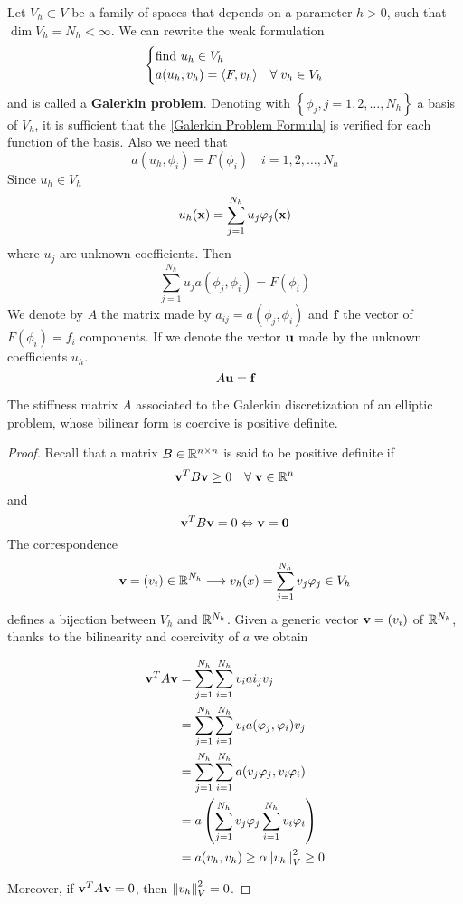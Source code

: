 Let \(V_h \subset V\) be a family of spaces that depends on a parameter \(h > 0\), such that \(\dim V_h = N_h < \infty\).
We can rewrite the weak formulation 
\begin{equation}
    \begin{cases}
        \text{find } u_h \in V_h\\
        a(u_h,v_h) = \langle F,v_h \rangle & \forall \; v_h \in V_h \label{Galerkin Problem Formula}
    \end{cases}
\end{equation}
and is called a \textbf{Galerkin problem}. Denoting with \(\left\{\phi_j, j = 1,2,\ldots,N_h\right\}\) a basis of \(V_h\), it is sufficient that the \eqref{Galerkin Problem Formula} is verified for each function of the basis. 
Also we need that 
\[
    a(u_h, \phi_i) = F(\phi_i) \quad i = 1, 2, \ldots , N_h
\]
Since \(u_h \in V_h\)
\[
    u_h(\textbf{x})=\sum_{j=1}^{N_h} u_j \varphi_j(\textbf{x})
\]
where \(u_j\) are unknown coefficients. Then
\[
    \sum_{j=1}^{N_h}u_j a(\phi_j, \phi_i) = F(\phi_i)
\]
We denote by \(A\) the matrix made by \(a_{ij} = a(\phi_j, \phi_i)\) and \(\textbf{f}\) the vector of \(F(\phi_i) = f_i\) components. If we denote the vector \(\textbf{u}\) made by the unknown coefficients \(u_h\).
\begin{equation}
    A\textbf{u} = \textbf{f}
    \label{Linear system Galerkin}
\end{equation}

    \begin{theorem}
    The stiffness matrix \(A\) associated to the Galerkin discretization of an elliptic problem, whose bilinear form is coercive is positive definite.
\end{theorem}
\begin{proof}
    Recall that a matrix \(B \in \mathbb{R}^{n\times n}\) is said to be positive definite if 
    \[
        \textbf{v}^TB\textbf{v} \geq 0 \quad \forall \; \textbf{v} \in \mathbb{R}^n
    \]
    and
    \[
        \textbf{v}^T B \textbf{v} = 0 \Leftrightarrow \textbf{v} = \textbf{0}
    \]
    The correspondence 
    \[
        \textbf{v} = (v_i) \in \mathbb{R}^{N_h} \longrightarrow v_h(x) = \sum_{j=1}^{N_h} v_j\varphi_j \in V_h
    \]
    defines a bijection between \(V_h\) and \(\mathbb{R}^{N_h}\). Given a generic vector \(\textbf{v} = (v_i)\) of \(\mathbb{R}^{N_h}\), thanks to the bilinearity and coercivity of \(a\) we obtain 
    
        \begin{align*}
        \textbf{v}^T A \textbf{v} & = \sum_{j=1}^{N_h}\sum_{i=1}^{N_h} v_i ai_j v_j \\
        & = \sum_{j=1}^{N_h}\sum_{i=1}^{N_h} v_ia(\varphi_j, \varphi_i)v_j\\
        & = \sum_{j=1}^{N_h}\sum_{i=1}^{N_h} a(v_j\varphi_j, v_i \varphi_i)\\
        & = a\left(\sum_{j=1}^{N_h}v_j\varphi_j\sum_{i=1}^{N_h}v_i\varphi_i\right)\\
        & = a(v_h,v_h) \geq \alpha \norm{v_h}_V^2 \geq 0
        \end{align*}

    Moreover, if \(\textbf{v}^T A \textbf{v} = 0\), then \(\norm{v_h}_V^2 = 0\).
\end{proof}



